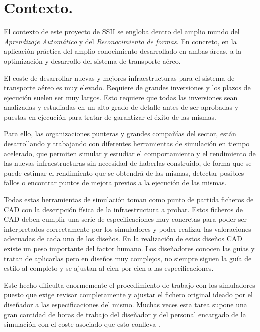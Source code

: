 \section{Contexto.}

El contexto de este proyecto de SSII se engloba dentro del amplio mundo del \textit{Aprendizaje Automático} y del \textit{Reconocimiento de formas}. En concreto, en la aplicación práctica del amplio conocimiento desarrollado en ambas áreas, a la optimización y desarrollo del sistema de transporte aéreo.

El coste de desarrollar nuevas y mejores infraestructuras para el sistema de transporte aéreo es muy elevado. Requiere de grandes inversiones y los plazos de ejecución suelen ser muy largos. Esto requiere que todas las inversiones sean analizadas y estudiadas en un alto grado de detalle antes de ser aprobadas y puestas en ejecución para tratar de garantizar el éxito de las mismas.

Para ello, las organizaciones punteras y grandes compañías del sector, están desarrollando y trabajando con diferentes herramientas de simulación en tiempo acelerado, que permiten simular y estudiar el comportamiento y el rendimiento de las nuevas infraestructuras sin necesidad de haberlas construido, de forma que se puede estimar el rendimiento que se obtendrá de las mismas, detectar posibles fallos o encontrar puntos de mejora previos a la ejecución de las mismas.

Todas estas herramientas de simulación toman como punto de partida ficheros de CAD \cite{CAD} con la descripción física de la infraestructura a probar. Estos ficheros de CAD deben cumplir una serie de especificaciones muy concretas para poder ser interpretados correctamente por los simuladores y poder realizar las valoraciones adecuadas de cada uno de los diseños. En la realización de estos diseños CAD existe un peso importante del factor humano. Los diseñadores conocen las guías y tratan de aplicarlas pero en diseños muy complejos, no siempre siguen la guía de estilo al completo y se ajustan al cien por cien a las especificaciones. 

Este hecho dificulta enormemente el procedimiento de trabajo con los simuladores puesto que exige revisar completamente y ajustar el fichero original ideado por el diseñador a las especificaciones del mismo. Muchas veces esta tarea supone una gran cantidad de horas de trabajo del diseñador y del personal encargado de la simulación con el coste asociado que esto conlleva \cite{Mariscal-2005}.


